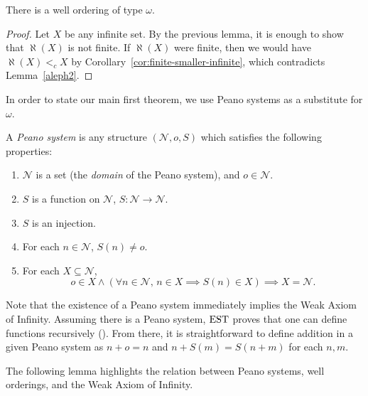 \begin{prop}[$\esti$]\label{pr:well-order-type-omega}
	There is a well ordering of type $\omega$.
\end{prop}
\begin{proof}
	Let $X$ be any infinite set. By the previous
        lemma, it is enough to show that $\aleph(X)$ is not finite. If $\aleph(X)$ were finite, then we would
        have $\aleph(X) <_c X$ by Corollary~\ref{cor:finite-smaller-infinite},
        which contradicts Lemma~\ref{aleph2}.
\end{proof}

In order to state our main first theorem, we use Peano systems as a substitute for $\omega$.
\begin{definition}\label{peano}
	A \emph{Peano system} is any structure $(\mathcal{N},o,S)$ which satisfies the following properties:
	\begin{enumerate}
		\item\label{item:1} $\mathcal{N}$ is a set (the \emph{domain} of the Peano system), and $o\in\mathcal{N}$.
		\item $S$ is a function on $\mathcal{N}$, $S: \mathcal{N}\rightarrow\mathcal{N}$.
		\item $S$ is an injection.
		\item \label{item:4} For each $n\in\mathcal{N}$, $S(n) \neq o$.
		\item For each $X\subseteq\mathcal{N}$,
		\[
		  o\in X \land (\forall n\in \mathcal{N}, \, n\in X \implies S(n)\in X) \implies X = \mathcal{N}.
		\]
	\end{enumerate}
\end{definition}

Note that the existence of a Peano system immediately implies the Weak Axiom of Infinity.
Assuming there is a Peano system, $\mathrm{EST}$ proves that one can define functions recursively (\cite[Theorem 5.6]{Moscho}). From there, it is straightforward to define addition in a given Peano system as $n+o = n$ and $n+S(m) = S(n+m)$ for each $n,m$.


The following lemma highlights the relation between Peano systems, well orderings, and the Weak Axiom of Infinity.

